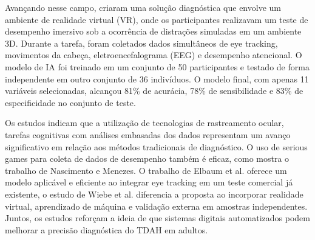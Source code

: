 Avançando nesse campo, \textcite{Wiebe2024} criaram uma solução diagnóstica que
envolve um ambiente de realidade virtual (VR), onde os participantes realizavam um teste de
desempenho imersivo sob a ocorrência de distrações simuladas em um ambiente 3D.
Durante a tarefa, foram coletados dados simultâneos de eye tracking, movimentos da
cabeça, eletroencefalograma (EEG) e desempenho atencional. O modelo de IA foi treinado
em um conjunto de 50 participantes e testado de forma independente em outro conjunto de
36 indivíduos. O modelo final, com apenas 11 variáveis selecionadas, alcançou 81\% de
acurácia, 78\% de sensibilidade e 83\% de especificidade no conjunto de teste.

Os estudos indicam que a utilização de tecnologias de rastreamento ocular, tarefas
cognitivas com análises embasadas dos dados representam um avanço significativo em
relação aos métodos tradicionais de diagnóstico. O uso de serious games para coleta de
dados de desempenho também é eficaz, como mostra o trabalho de Nascimento e Menezes.
O trabalho de Elbaum et al. oferece um modelo aplicável e eficiente ao integrar eye tracking
em um teste comercial já existente, o estudo de Wiebe et al. diferencia a proposta ao
incorporar realidade virtual, aprendizado de máquina e validação externa em amostras
independentes. Juntos, os estudos reforçam a ideia de que sistemas digitais automatizados
podem melhorar a precisão diagnóstica do TDAH em adultos.

